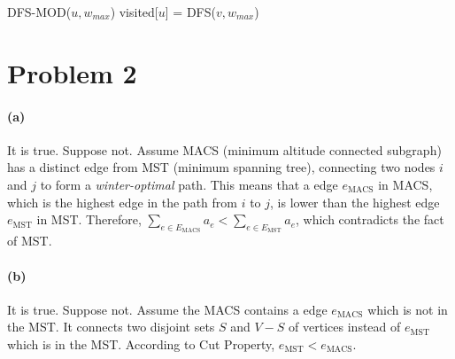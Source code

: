 \documentclass[a4paper,12pt]{article}
\begin{document}
\begin{algorithm}
\begin{algorithmic}
\STATE DFS-MOD($u, w_{max}$)
\STATE visited[$u$] = \TRUE
{}
\STATE DFS($v, w_{max}$)
\ENDIF
\ENDFOR
\end{algorithmic}
\end{algorithm}

\section*{Problem 2}
\paragraph*{(a)} It is true. Suppose not. Assume MACS (minimum 
altitude connected subgraph) has a distinct edge from MST (minimum 
spanning tree), connecting two nodes $i$ and $j$ to form a 
\textit{winter-optimal} path. This means that a edge $e_{\text{MACS}}$
in MACS, which is the highest edge in the path from $i$ to $j$, is 
lower than the highest edge $e_{\text{MST}}$ in MST. Therefore,
$\sum\limits_{e \in E_{\text{MACS}}}a_e < \sum\limits_{e \in 
 E_{\text{MST}}}a_e$, which contradicts the fact of MST.

%
%

\paragraph*{(b)}
It is true. Suppose not. Assume the MACS contains a edge 
$e_{\text{MACS}}$ which is not in the MST. It connects two disjoint
sets $S$ and $V-S$ of vertices instead of $e_{\text{MST}}$ which is
in the MST. According to Cut Property, $e_{\text{MST}} < 
e_{\text{MACS}}$. 
\end{document}

